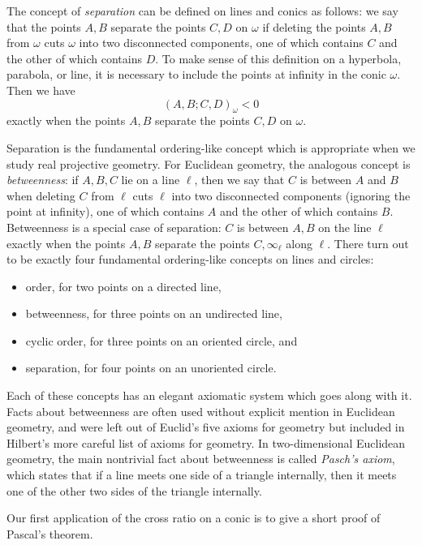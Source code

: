 \begin{rem} The concept of \emph{separation} can be defined on lines and conics as follows: we say that the points $A,B$ separate the points $C,D$ on $\omega$ if deleting the points $A,B$ from $\omega$ cuts $\omega$ into two disconnected components, one of which contains $C$ and the other of which contains $D$. To make sense of this definition on a hyperbola, parabola, or line, it is necessary to include the points at infinity in the conic $\omega$. Then we have
\[
(A,B;C,D)_\omega < 0
\]
exactly when the points $A,B$ separate the points $C,D$ on $\omega$.

Separation is the fundamental ordering-like concept which is appropriate when we study real projective geometry. For Euclidean geometry, the analogous concept is \emph{betweenness}: if $A,B,C$ lie on a line $\ell$, then we say that $C$ is between $A$ and $B$ when deleting $C$ from $\ell$ cuts $\ell$ into two disconnected components (ignoring the point at infinity), one of which contains $A$ and the other of which contains $B$. Betweenness is a special case of separation: $C$ is between $A,B$ on the line $\ell$ exactly when the points $A,B$ separate the points $C,\infty_\ell$ along $\ell$. There turn out to be exactly four fundamental ordering-like concepts on lines and circles:
\begin{itemize}
\item order, for two points on a directed line,
\item betweenness, for three points on an undirected line,
\item cyclic order, for three points on an oriented circle, and
\item separation, for four points on an unoriented circle.
\end{itemize}
Each of these concepts has an elegant axiomatic system which goes along with it. Facts about betweenness are often used without explicit mention in Euclidean geometry, and were left out of Euclid's five axioms for geometry but included in Hilbert's more careful list of axioms for geometry. In two-dimensional Euclidean geometry, the main nontrivial fact about betweenness is called \emph{Pasch's axiom}, which states that if a line meets one side of a triangle internally, then it meets one of the other two sides of the triangle internally.
\end{rem}

Our first application of the cross ratio on a conic is to give a short proof of Pascal's theorem.


